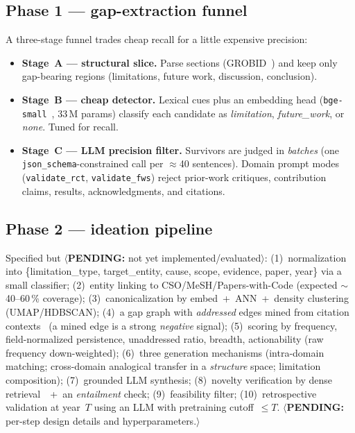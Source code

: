 \documentclass[10pt,a4paper]{article}
\newcommand{\pending}[1]{\textcolor{red!80!black}{$\langle$\textbf{PENDING:} #1$\rangle$}}
\begin{document}
\subsection{Phase 1 --- gap-extraction funnel}
A three-stage funnel trades cheap recall for a little expensive precision:
\begin{itemize}[leftmargin=1.4em,itemsep=1pt]
  \item \textbf{Stage~A --- structural slice.} Parse sections (GROBID~\citep{grobid}) and keep
  only gap-bearing regions (limitations, future work, discussion, conclusion).
  \item \textbf{Stage~B --- cheap detector.} Lexical cues plus an embedding head
  (\texttt{bge-small}~\citep{bgesmall}, 33\,M params) classify each candidate as
  \emph{limitation}, \emph{future\_work}, or \emph{none}. Tuned for recall.
  \item \textbf{Stage~C --- LLM precision filter.} Survivors are judged in \emph{batches}
  (one \texttt{json\_schema}-constrained call per $\approx$40 sentences). Domain prompt modes
  (\texttt{validate\_rct}, \texttt{validate\_fws}) reject prior-work critiques, contribution
  claims, results, acknowledgments, and citations.
\end{itemize}

\subsection{Phase 2 --- ideation pipeline}
Specified but \pending{not yet implemented/evaluated}:
(1)~normalization into \{limitation\_type, target\_entity, cause, scope, evidence, paper, year\}
via a small classifier; (2)~entity linking to CSO/MeSH/Papers-with-Code (expected
$\sim$40--60\,\% coverage); (3)~canonicalization by embed~+~ANN~+~density clustering
(UMAP/HDBSCAN); (4)~a gap graph with \emph{addressed} edges mined from citation
contexts~\citep{s2orc} (a mined edge is a strong \emph{negative} signal); (5)~scoring by
frequency, field-normalized persistence, unaddressed ratio, breadth, actionability
(raw frequency down-weighted); (6)~three generation mechanisms (intra-domain matching;
cross-domain analogical transfer in a \emph{structure} space; limitation composition);
(7)~grounded LLM synthesis; (8)~novelty verification by dense retrieval~\citep{specter}~+~an
\emph{entailment} check; (9)~feasibility filter; (10)~retrospective validation at year~$T$ using
an LLM with pretraining cutoff~$\le T$. \pending{per-step design details and hyperparameters.}
\end{document}
